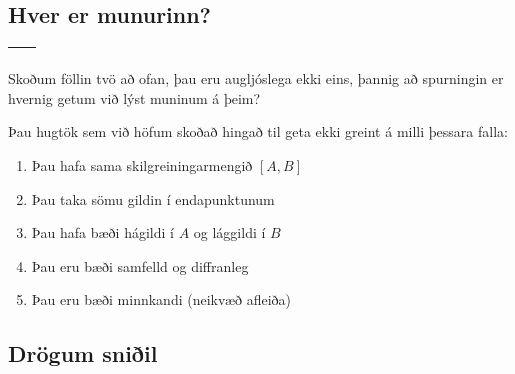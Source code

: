 \documentclass[b5paper,10pt,icelandic]{sphinxmanual}
\begin{document}
\subsection{Hver er munurinn?}
\label{\detokenize{kafli05:hver-er-munurinn}}

\begin{savenotes}\sphinxattablestart
\centering
\begin{tabulary}{\linewidth}[t]{|T|T|}
\hline
{}\label{\detokenize{kafli05:figa}}
&\label{\detokenize{kafli05:figb}}
\\
\hline
\end{tabulary}
\par
\sphinxattableend\end{savenotes}

Skoðum föllin tvö að ofan, þau eru augljóslega ekki eins, þannig að
spurningin er hvernig getum við lýst muninum á þeim?

Þau hugtök sem við höfum skoðað hingað til geta ekki greint á milli
þessara falla:
\begin{enumerate}
\item {} 
Þau hafa sama skilgreiningarmengið \([A,B]\)

\item {} 
Þau taka sömu gildin í endapunktunum

\item {} 
Þau hafa bæði hágildi í \(A\) og lággildi í \(B\)

\item {} 
Þau eru bæði samfelld og diffranleg

\item {} 
Þau eru bæði minnkandi (neikvæð afleiða)

\end{enumerate}


\subsection{Drögum sniðil}
\label{\detokenize{kafli05:drogum-sniil}}
\end{document}
